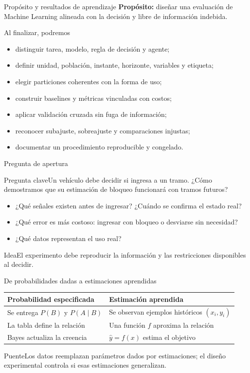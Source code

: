 \documentclass[aspectratio=169,10pt]{beamer}
\newcommand{\pregunta}[1]{\begin{block}{Pregunta clave}#1\end{block}}
\begin{document}
\begin{frame}{Propósito y resultados de aprendizaje}
  \small \textbf{Propósito:} diseñar una evaluación de Machine Learning alineada con la decisión y libre de información indebida.
  \begin{block}{Al finalizar, podremos}
  \begin{itemize}
    \item distinguir tarea, modelo, regla de decisión y agente;
    \item definir unidad, población, instante, horizonte, variables y etiqueta;
    \item elegir particiones coherentes con la forma de uso;
    \item construir baselines y métricas vinculadas con costos;
    \item aplicar validación cruzada sin fuga de información;
    \item reconocer subajuste, sobreajuste y comparaciones injustas;
    \item documentar un procedimiento reproducible y congelado.
  \end{itemize}
  \end{block}
\end{frame}

\begin{frame}{Pregunta de apertura}
  \small
  \pregunta{Un vehículo debe decidir si ingresa a un tramo. ¿Cómo demostramos que su estimación de bloqueo funcionará con tramos futuros?}
  \begin{itemize}
    \item ¿Qué señales existen antes de ingresar? ¿Cuándo se confirma el estado real?
    \item ¿Qué error es más costoso: ingresar con bloqueo o desviarse sin necesidad?
    \item ¿Qué datos representan el uso real?
  \end{itemize}
  \begin{alertblock}{Idea}El experimento debe reproducir la información y las restricciones disponibles al decidir.\end{alertblock}
\end{frame}

\begin{frame}{De probabilidades dadas a estimaciones aprendidas}
  \small
  \begin{tabularx}{\textwidth}{XX}\toprule
  \textbf{Probabilidad especificada} & \textbf{Estimación aprendida}\\\midrule
  Se entrega $P(B)$ y $P(A\mid B)$ & Se observan ejemplos históricos $(x_i,y_i)$\\
  La tabla define la relación & Una función $f$ aproxima la relación\\
  Bayes actualiza la creencia & $\hat y=f(x)$ estima el objetivo\\\bottomrule
  \end{tabularx}
  \begin{block}{Puente}Los datos reemplazan parámetros dados por estimaciones; el diseño experimental controla si esas estimaciones generalizan.\end{block}
\end{frame}
\end{document}
